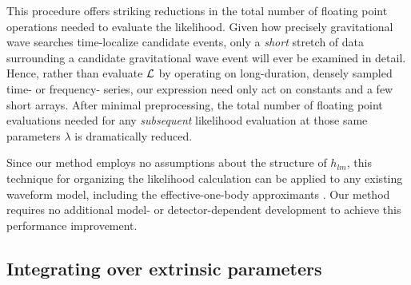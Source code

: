 This procedure offers striking reductions in the total number of floating point operations needed to evaluate the
likelihood.
Given how precisely gravitational wave searches time-localize candidate events, only a \emph{short} stretch of data
surrounding a candidate gravitational wave event will ever be examined in  detail.  Hence, rather than evaluate ${\cal L}$ by operating on long-duration, densely sampled
time- or frequency- series, our expression need only act on constants and a few short arrays.  After minimal preprocessing, the total number of
floating point evaluations needed for any \emph{subsequent} likelihood evaluation at those same parameters $\lambda$ is
dramatically reduced.  

%
Since our method employs no assumptions about the structure of $h_{lm}$, this technique for organizing the likelihood
calculation can be applied to any existing waveform model, including the effective-one-body approximants
\cite{gw-astro-EOBspin-Tarrachini2012,gw-astro-EOBNR-Calibrated-2009}.  
Our method requires no  additional model- or detector-dependent development  to achieve this performance improvement.  


\subsection{Integrating over extrinsic parameters}
\label{subsec:extrinsic}

